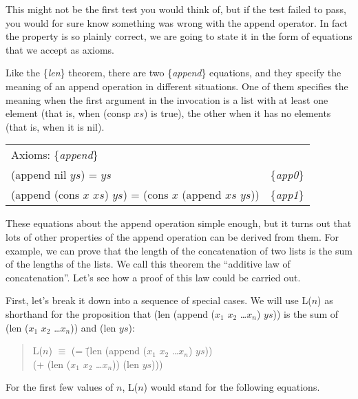 This might not be the first test you would think of, but if the test failed to pass, you would for sure know something was wrong with the append operator. In fact the property is so plainly correct, we are going to state it in the form of equations that we accept as axioms.

Like the \{\emph{len}\} theorem, there are two \{\emph{append}\} equations, and they specify the meaning of an append operation in different situations. One of them specifies the meaning when the first argument in the invocation is a list with at least one element (that is, when (consp $xs$) is true), the other when it has no elements (that is, when it is nil).

\label{append-equations}
\begin{center}
\begin{tabular}{ll}
Axioms: \{\emph{append}\}                                     &                 \\
(append nil $ys$) =  $ys$                                     & \{\emph{app0}\} \\
(append (cons $x$ $xs$) $ys$) = (cons $x$ (append $xs$ $ys$)) & \{\emph{app1}\} \\
\end{tabular}
\end{center}

\label{additive-law-concatenation}
These equations about the append operation simple enough, but it turns out that lots of other properties of the append operation can be derived from them. For example, we can prove that the length of the concatenation of two lists is the sum of the lengths of the lists. We call this theorem the ``additive law of concatenation''. Let's see how a proof of this law could be carried out.

First, let's break it down into a sequence of special cases. We will use L($n$) as shorthand for the proposition that (len (append ($x_1$ $x_2$ \dots $x_n$) $ys$)) is the sum of (len ($x_1$ $x_2$ \dots $x_n$)) and (len $ys$):

\begin{quote}
\begin{tabbing}
L($n$) $\equiv$ (= \=(len (append ($x_1$ $x_2$ \dots $x_n$) $ys$))  \\
                   \>(+ (len ($x_1$ $x_2$ \dots $x_n$)) (len $ys$)))
\end{tabbing}
\end{quote}

For the first few values of $n$, L($n$) would stand for the following equations.

